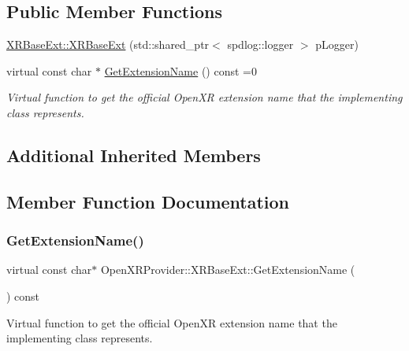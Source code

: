 \subsection*{Public Member Functions}
\begin{DoxyCompactItemize}
\item 
\mbox{\hyperlink{class_open_x_r_provider_1_1_x_r_base_ext_a8f59e68df5f1773152a3dfbe9ddc17fc}{X\+R\+Base\+Ext\+::\+X\+R\+Base\+Ext}} (std\+::shared\+\_\+ptr$<$ spdlog\+::logger $>$ p\+Logger)
\item 
virtual const char $\ast$ \mbox{\hyperlink{class_open_x_r_provider_1_1_x_r_base_ext_af23385b0dc226b0c4533a796ddc37352}{Get\+Extension\+Name}} () const =0
\begin{DoxyCompactList}\small\item\em Virtual function to get the official Open\+XR extension name that the implementing class represents. \end{DoxyCompactList}\end{DoxyCompactItemize}
\subsection*{Additional Inherited Members}


\subsection{Member Function Documentation}
\mbox{\label{class_open_x_r_provider_1_1_x_r_base_ext_af23385b0dc226b0c4533a796ddc37352}} 
\subsubsection{\texorpdfstring{GetExtensionName()}{GetExtensionName()}}
{\footnotesize\ttfamily virtual const char$\ast$ Open\+X\+R\+Provider\+::\+X\+R\+Base\+Ext\+::\+Get\+Extension\+Name (\begin{DoxyParamCaption}{ }\end{DoxyParamCaption}) const\hspace{0.3cm}{\ttfamily [pure virtual]}}



Virtual function to get the official Open\+XR extension name that the implementing class represents. 



